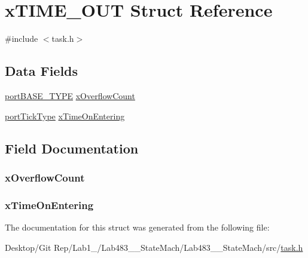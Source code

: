 \hypertarget{structx_t_i_m_e___o_u_t}{\section{x\-T\-I\-M\-E\-\_\-\-O\-U\-T Struct Reference}
\label{structx_t_i_m_e___o_u_t}
}


{\ttfamily \#include $<$task.\-h$>$}

\subsection*{Data Fields}
\begin{DoxyCompactItemize}
\item 
\hyperlink{portmacro_8h_a1ebe82d24d764ae4e352f7c3a9f92c01}{port\-B\-A\-S\-E\-\_\-\-T\-Y\-P\-E} \hyperlink{structx_t_i_m_e___o_u_t_a8cdd91ac71d71b02b1a21e53eafc2eaa}{x\-Overflow\-Count}
\item 
\hyperlink{portmacro_8h_a4d746b2ff8fafc490b764c66411ec457}{port\-Tick\-Type} \hyperlink{structx_t_i_m_e___o_u_t_a59ada3bc5e277bf9a1c9bbcc6998a2e7}{x\-Time\-On\-Entering}
\end{DoxyCompactItemize}


\subsection{Field Documentation}
\hypertarget{structx_t_i_m_e___o_u_t_a8cdd91ac71d71b02b1a21e53eafc2eaa}{
\subsubsection[{x\-Overflow\-Count}]{ x\-Overflow\-Count}}\label{structx_t_i_m_e___o_u_t_a8cdd91ac71d71b02b1a21e53eafc2eaa}
\hypertarget{structx_t_i_m_e___o_u_t_a59ada3bc5e277bf9a1c9bbcc6998a2e7}{
\subsubsection[{x\-Time\-On\-Entering}]{ x\-Time\-On\-Entering}}\label{structx_t_i_m_e___o_u_t_a59ada3bc5e277bf9a1c9bbcc6998a2e7}


The documentation for this struct was generated from the following file\-:\begin{DoxyCompactItemize}
\item 
Desktop/\-Git Rep/\-Lab1\-\_/\-Lab483\-\_\-\_\-\-State\-Mach/\-Lab483\-\_\-\_\-\-State\-Mach/src/\hyperlink{task_8h}{task.\-h}\end{DoxyCompactItemize}
